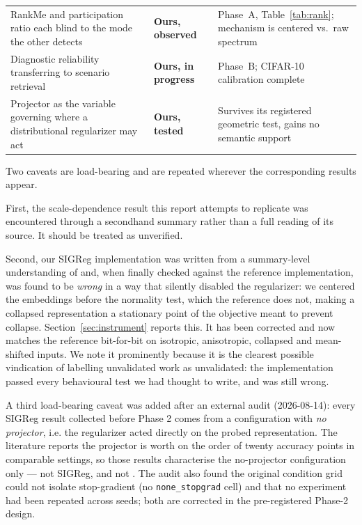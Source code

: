 \begin{table}[h]
\begin{tabular}{p{5.2cm} p{2.6cm} p{6.2cm}}
RankMe and participation ratio each blind to the mode the other detects & \textbf{Ours, observed} & Phase~A, Table~\ref{tab:rank}; mechanism is centered vs.\ raw spectrum \\
Diagnostic reliability transferring to scenario retrieval & \textbf{Ours, in progress} & Phase~B; CIFAR-10 calibration complete \\
Projector as the variable governing where a distributional regularizer may act & \textbf{Ours, tested} & Survives its registered geometric test, gains no semantic support \\
\bottomrule
\end{tabular}
\end{table}

Two caveats are load-bearing and are repeated wherever the corresponding results appear.

First, the scale-dependence result this report attempts to replicate \replication{} was
encountered through a secondhand summary rather than a full reading of its source. It
should be treated as unverified.

Second, our SIGReg implementation was written from a summary-level understanding of
\citet{lejepa2025} and, when finally checked against the reference implementation, was
found to be \emph{wrong} in a way that silently disabled the regularizer: we centered the
embeddings before the normality test, which the reference does not, making a collapsed
representation a stationary point of the objective meant to prevent collapse.
Section~\ref{sec:instrument} reports this. It has been corrected and now matches the
reference bit-for-bit on isotropic, anisotropic, collapsed and mean-shifted inputs. We note
it prominently because it is the clearest possible vindication of labelling unvalidated
work as unvalidated: the implementation passed every behavioural test we had thought to
write, and was still wrong. \interp{}

A third load-bearing caveat was added after an external audit (2026-08-14): every SIGReg
result collected before Phase 2 comes from a configuration with \emph{no projector}, i.e.
the regularizer acted directly on the probed representation. The literature reports the
projector is worth on the order of twenty accuracy points in comparable settings, so those
results characterise the no-projector configuration only — not SIGReg, and not
\citet{lejepa2025}. The audit also found the original condition grid could not isolate
stop-gradient (no \texttt{none\_stopgrad} cell) and that no experiment had been repeated
across seeds; both are corrected in the pre-registered Phase-2 design.
